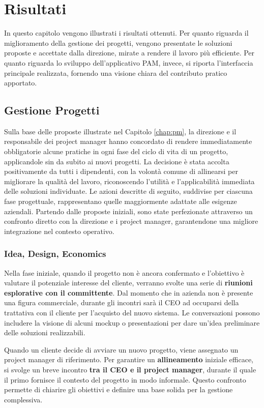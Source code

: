 \chapter{Risultati}
\label{chap:Results}

In questo capitolo vengono illustrati i risultati ottenuti. Per quanto riguarda il miglioramento
della gestione dei progetti, vengono presentate le soluzioni proposte e accettate dalla direzione,
mirate a rendere il lavoro più efficiente. Per quanto riguarda lo sviluppo dell’applicativo \ac{PAM},
invece, si riporta l’interfaccia principale realizzata, fornendo una visione chiara del contributo
pratico apportato.

\section{Gestione Progetti}
Sulla base delle proposte illustrate nel Capitolo \ref{chap:pm}, la direzione e il responsabile dei
project manager hanno concordato di rendere immediatamente obbligatorie alcune pratiche in ogni fase
del ciclo di vita di un progetto, applicandole sin da subito ai nuovi progetti.
La decisione è stata accolta positivamente da tutti i dipendenti, con la volontà comune di allinearsi per migliorare
la qualità del lavoro, riconoscendo l’utilità e l’applicabilità immediata delle soluzioni individuate.
Le azioni descritte di seguito, suddivise per ciascuna fase progettuale, rappresentano quelle maggiormente adattate
alle esigenze aziendali. Partendo dalle proposte iniziali, sono state perfezionate attraverso un confronto diretto
con la direzione e i project manager, garantendone una migliore integrazione nel contesto operativo.

    \subsection{Idea, Design, Economics}
    Nella fase iniziale, quando il progetto non è ancora confermato e l'obiettivo è valutare il potenziale interesse
    del cliente, verranno svolte una serie di \textbf{riunioni esplorative con il committente}.
    Dal momento che in azienda non è presente una figura commerciale, durante gli incontri sarà il CEO ad occuparsi
    della trattativa con il cliente per l'acquisto del nuovo sistema. Le conversazioni
    possono includere la visione di alcuni mockup o presentazioni per dare un'idea preliminare delle soluzioni realizzabili.

    Quando un cliente decide di avviare un nuovo progetto, viene assegnato un project manager di riferimento.
    Per garantire un \textbf{allineamento} iniziale efficace, si svolge un breve incontro \textbf{tra il CEO e il project manager},
    durante il quale il primo fornisce il contesto del progetto in modo informale.
    Questo confronto permette di chiarire gli obiettivi e definire una base solida per la gestione complessiva.

